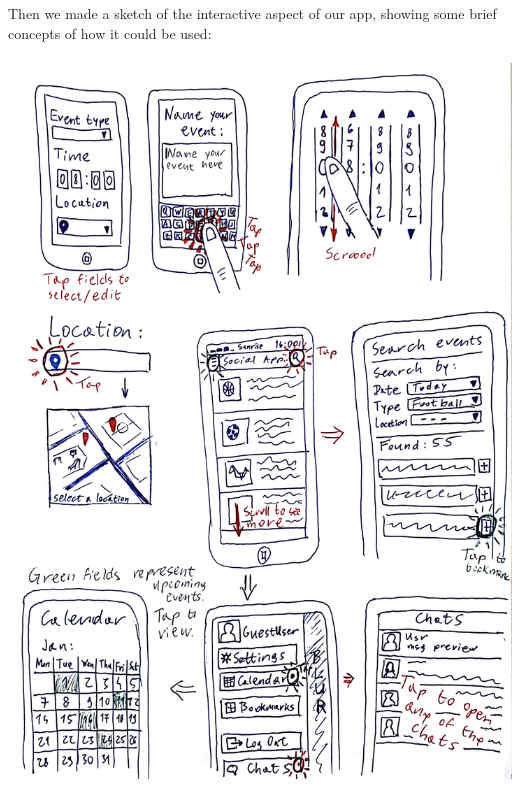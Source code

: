 \documentclass[12pt]{report}
\begin{document}
	Then we made a sketch of the interactive aspect of our app, showing some brief concepts of how it could be used:\\\\
	\includegraphics[scale=0.15]{Interaction.jpg}\break
	\newpage
\end{document}

